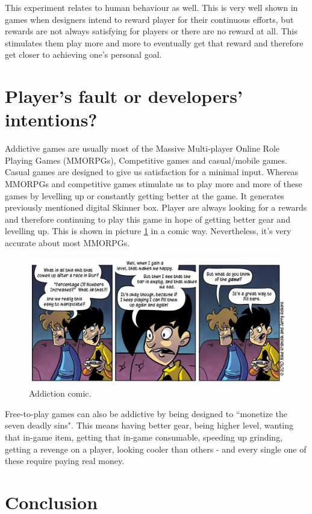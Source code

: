 \documentclass{scrartcl}
\begin{document}
This experiment relates to human behaviour as well. This is very well shown in games when designers intend to reward player for their continuous efforts, but rewards are not always satisfying for players or there are no reward at all. This stimulates them play more and more to eventually get that reward and therefore get closer to achieving one's personal goal.

\section{Player's fault or developers' intentions?}

Addictive games are usually most of the Massive Multi-player Online Role Playing Games (MMORPGs), Competitive games and casual/mobile games. Casual games are designed to give us satisfaction for a minimal input\cite{vgaddiction}. Whereas MMORPGs and competitive games stimulate us to play more and more of these games by levelling up or constantly getting better at the game. It generates previously mentioned digital Skinner box. Player are always looking for a rewards and therefore continuing to play this game in hope of getting better gear and levelling up. This is shown in picture \ref{fig:comic} in a comic way. Nevertheless, it's very accurate about most MMORPGs.

\begin{figure}
  \includegraphics[width=\linewidth]{Images/AddictionComic.jpg}
  \caption{Addiction comic.}
  \label{fig:comic}
\end{figure}

Free-to-play games can also be addictive by being designed to ``monetize the seven deadly sins"\cite{vgaddiction}. This means having better gear, being higher level, wanting that in-game item, getting that in-game consumable, speeding up grinding, getting a revenge on a player, looking cooler than others - and every single one of these require paying real money. 

\section{Conclusion}



\end{document}
